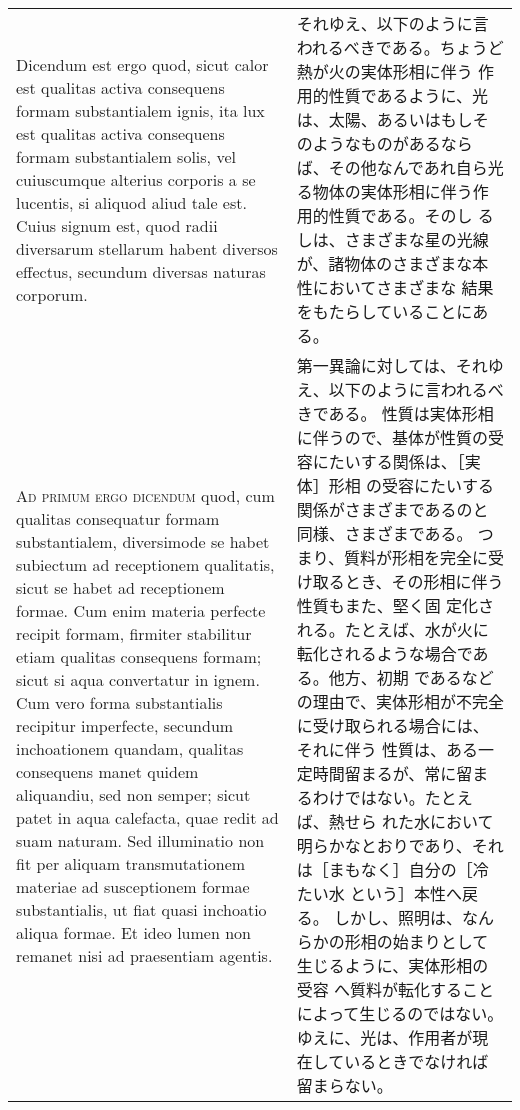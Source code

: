 \documentclass[10pt]{jsarticle} %
\begin{document}
\begin{longtable}{p{21em}p{21em}}
\\


Dicendum est ergo quod, sicut calor est qualitas activa
consequens formam substantialem ignis, ita lux est qualitas activa
consequens formam substantialem solis, vel cuiuscumque alterius corporis
a se lucentis, si aliquod aliud tale est. Cuius signum est, quod radii
diversarum stellarum habent diversos effectus, secundum diversas naturas
corporum.

&

それゆえ、以下のように言われるべきである。ちょうど熱が火の実体形相に伴う
作用的性質であるように、光は、太陽、あるいはもしそのようなものがあるなら
ば、その他なんであれ自ら光る物体の実体形相に伴う作用的性質である。そのし
 るしは、さまざまな星の光線が、諸物体のさまざまな本性においてさまざまな
 結果をもたらしていることにある。

\\


{\scshape Ad primum ergo dicendum} quod, cum qualitas
consequatur formam substantialem, diversimode se habet subiectum ad
receptionem qualitatis, sicut se habet ad receptionem formae. Cum enim
materia perfecte recipit formam, firmiter stabilitur etiam qualitas
consequens formam; sicut si aqua convertatur in ignem. Cum vero forma
substantialis recipitur imperfecte, secundum inchoationem quandam,
qualitas consequens manet quidem aliquandiu, sed non semper; sicut patet
in aqua calefacta, quae redit ad suam naturam. Sed illuminatio non fit
per aliquam transmutationem materiae ad susceptionem formae
substantialis, ut fiat quasi inchoatio aliqua formae. Et ideo lumen non
remanet nisi ad praesentiam agentis.

&

第一異論に対しては、それゆえ、以下のように言われるべきである。
性質は実体形相に伴うので、基体が性質の受容にたいする関係は、［実体］形相
 の受容にたいする関係がさまざまであるのと同様、さまざまである。
つまり、質料が形相を完全に受け取るとき、その形相に伴う性質もまた、堅く固
 定化される。たとえば、水が火に転化されるような場合である。他方、初期
 であるなどの理由で、実体形相が不完全に受け取られる場合には、それに伴う
 性質は、ある一定時間留まるが、常に留まるわけではない。たとえば、熱せら
 れた水において明らかなとおりであり、それは［まもなく］自分の［冷たい水
 という］本性へ戻る。
しかし、照明は、なんらかの形相の始まりとして生じるように、実体形相の受容
 へ質料が転化することによって生じるのではない。ゆえに、光は、作用者が現
 在しているときでなければ留まらない。

\\



\end{longtable}
\end{document}
